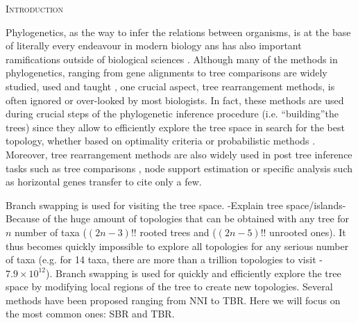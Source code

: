 \documentclass[12pt,letterpaper]{article}
\renewcommand{\section}[1]{%
\bigskip
\begin{center}
\begin{Large}
\normalfont\scshape #1
\medskip
\end{Large}
\end{center}}
\begin{document}
\section{Introduction}

Phylogenetics, as the way to infer the relations between organisms, is at the base of literally every endeavour in modern biology ans has also important ramifications outside of biological sciences \citep[e.g. linguistics;][]{Bouckaert24082012}.
Although many of the methods in phylogenetics, ranging from gene alignments \citep[e.g.][]{Tan01092015} to tree comparisons \citep[e.g.][]{kuhner2015treComparison} are widely studied, used and taught \citep{desalle2012phylogenomics}, one crucial aspect, tree rearrangement methods, is often ignored or over-looked by most biologists.
In fact, these methods are used during crucial steps of the phylogenetic inference procedure (i.e. ``building''the trees) since they allow to efficiently explore the tree space \citep[see ]{Sanderson448} in search for the best topology, whether based on optimality criteria \citep[e.g. maximum parsimony; ][]{swofford2003paup} or probabilistic methods \citep[e.g. likelihood or Bayesian; ][]{Stamatakis21012014,Ronquist2012mrbayes}.
Moreover, tree rearrangement methods are also widely used in post tree inference tasks such as tree comparisons \citep[e.g.][]{allen2001subtree,kuhner2015treComparison}, node support estimation \citep[e.g][]{goloboff2014bias} or specific analysis such as horizontal genes transfer \citep[e.g.][]{mcfadden1995something,bordewich2005computational} to cite only a few.

Branch swapping is used for visiting the tree space.
-Explain tree space/islands-
Because of the huge amount of topologies that can be obtained with any tree for $n$ number of taxa ($(2n-3)!!$ rooted trees and ($(2n-5)!!$ unrooted ones).
It thus becomes quickly impossible to explore all topologies for any serious number of taxa (e.g. for 14 taxa, there are more than a trillion topologies to visit - $7.9\times10^{12}$).
Branch swapping is used for quickly and efficiently explore the tree space by modifying local regions of the tree to create new topologies.
Several methods have been proposed ranging from NNI to TBR.
Here we will focus on the most common ones: SBR and TBR.

\end{document}
